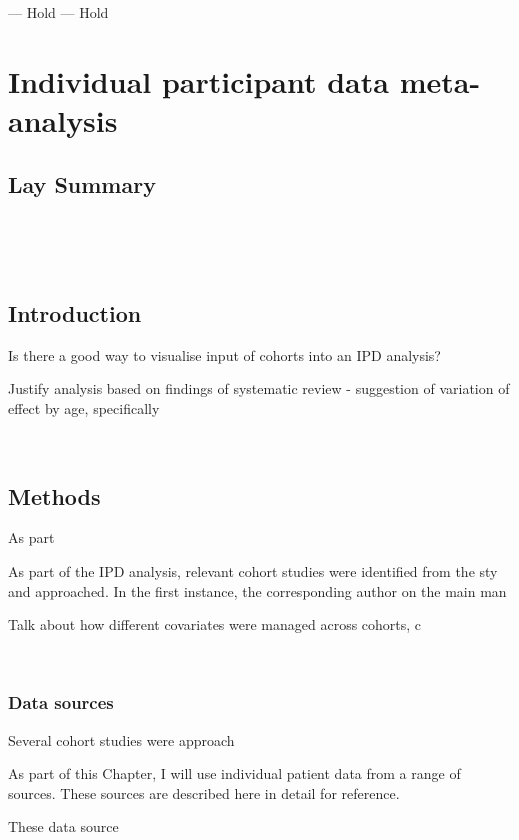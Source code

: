 \documentclass[a4paper, twoside]{templates/ociamthesis}
\begin{document}
--- Hold --- Hold

\hypertarget{ipd-heading}{%
\chapter{Individual participant data meta-analysis}\label{ipd-heading}}

\minitoc 

\hypertarget{lay-summary-4}{%
\section{Lay Summary}\label{lay-summary-4}}

~

~

\hypertarget{introduction-2}{%
\section{Introduction}\label{introduction-2}}

Is there a good way to visualise input of cohorts into an IPD analysis?

Justify analysis based on findings of systematic review - suggestion of variation of effect by age, specifically

~

\hypertarget{methods-2}{%
\section{Methods}\label{methods-2}}

As part

As part of the IPD analysis, relevant cohort studies were identified from the sty and approached. In the first instance, the corresponding author on the main man

Talk about how different covariates were managed across cohorts,
c

~

\hypertarget{data-sources}{%
\subsection{Data sources}\label{data-sources}}

Several cohort studies were approach

As part of this Chapter, I will use individual patient data from a range of sources. These sources are described here in detail for reference.

These data source
\end{document}
